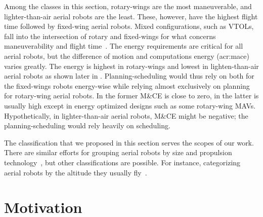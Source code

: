 Among the classes in this section, rotary-wings are the most maneuverable, and lighter-than-air aerial robots are the least. These, however, have the highest flight time followed by fixed-wing aerial robots. Mixed configurations, such as VTOLs, fall into the intersection of rotary and fixed-wings for what concerns maneuverability and flight time~\citep{siciliano2016springer}. The energy requirements are critical for all aerial robots, but the difference of motion and computations energy (\Gls{acr:mace}) varies greatly. The energy is highest in rotary-wings and lowest in lighten-than-air aerial robots as shown later in . Planning-scheduling would thus rely on both for the fixed-wings robots energy-wise while relying almost exclusively on planning for rotary-wing aerial robots. In the former M\&CE is close to zero, in the latter is usually high except in energy optimized designs such as some rotary-wing MAVs. Hypothetically, in lighter-than-air aerial robots, M\&CE might be negative; the planning-scheduling would rely heavily on scheduling.

The classification that we proposed in this section serves the scopes of our work. There are similar efforts for grouping aerial robots by size and propulsion technology~\citep{hoffer2014survey,cabreira2019survey}, but other classifications are possible. For instance, categorizing aerial robots by the altitude they usually fly~\citep{watts2012unmanned}.


\section{Motivation}
\label{sec:motivation}

